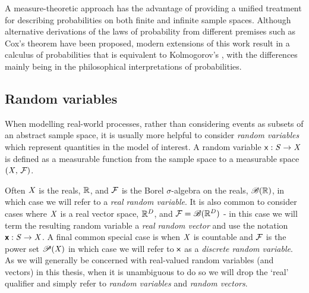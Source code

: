 A measure-theoretic approach has the advantage of providing a unified treatment for describing probabilities on both finite and infinite sample spaces. Although alternative derivations of the laws of probability from different premises such as Cox's theorem \citep{cox1946probability,cox1963algebra} have been proposed, modern extensions of this work result in a calculus of probabilities that is equivalent to Kolmogorov's \citep{terenin2015cox}, with the differences mainly being in the philosophical interpretations of probabilities.

\subsection{Random variables}\label{subsec:random-variables}

When modelling real-world processes, rather than considering events as subsets of an abstract sample space, it is usually more helpful to consider \emph{random variables} which represent quantities in the model of interest. A random variable $\mathsf{x} : \mathit{S} \to \mathit{X}$ is defined as a measurable function from the sample space to a measurable space $(\mathit{X},\,\mathcal{F})$. 

Often $\mathit{X}$ is the reals, $\mathbb{R}$, and $\mathcal{F}$ is the Borel $\sigma$-algebra on the reals, $\mathscr{B}(\mathbb{R})$, in which case we will refer to a \emph{real random variable}. It is also common to consider cases where $\mathit{X}$ is a real vector space, $\mathbb{R}^D$, and $\mathcal{F} = \mathscr{B}(\mathbb{R}^D)$ - in this case we will term the resulting random variable a \emph{real random vector} and use the notation $\boldsymbol{\mathsf{x}} : \mathit{S} \to \mathit{X}$. A final common special case is when $\mathit{X}$ is countable and $\mathcal{F}$ is the power set $\mathscr{P}(\mathit{X})$ in which case we will refer to $\mathsf{x}$ as a \emph{discrete random variable}. As we will generally be concerned with real-valued random variables (and vectors) in this thesis, when it is unambiguous to do so we will drop the `real' qualifier and simply refer to \emph{random variables} and \emph{random vectors}.

